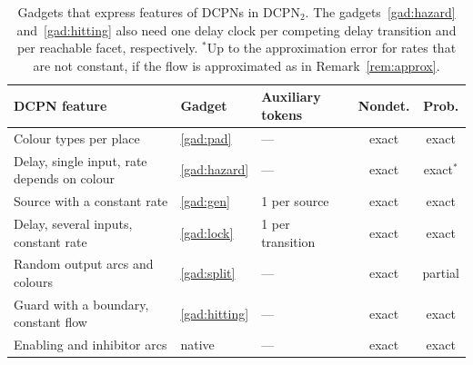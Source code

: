 \documentclass[11pt]{article}
\theoremstyle{definition}
\newcommand{\DCPN}[1]{\texorpdfstring{\textup{DCPN}\ensuremath{_{#1}}}{DCPN#1}}
\begin{document}
\begin{table}[t]
  \centering
  \small
  \begin{tabular}{lllcc}
    \hline
    DCPN feature & Gadget & Auxiliary tokens & Nondet. & Prob. \\
    \hline
    Colour types per place & \ref{gad:pad} & --- & exact & exact \\
    Delay, single input, rate depends on colour
      & \ref{gad:hazard} & --- & exact & exact$^{*}$ \\
    Source with a constant rate & \ref{gad:gen} & 1 per source & exact
      & exact \\
    Delay, several inputs, constant rate & \ref{gad:lock}
      & 1 per transition & exact & exact \\
    Random output arcs and colours & \ref{gad:split} & --- & exact
      & partial \\
    Guard with a boundary, constant flow & \ref{gad:hitting} & --- & exact
      & exact \\
    Enabling and inhibitor arcs & native & --- & exact & exact \\
    \hline
  \end{tabular}
  \caption{Gadgets that express features of DCPNs in \DCPN{2}. The
    gadgets~\ref{gad:hazard} and~\ref{gad:hitting} also need one delay clock
    per competing delay transition and per reachable facet, respectively.
    $^{*}$Up to the approximation error for rates that are not constant,
    if the flow is approximated as in Remark~\ref{rem:approx}.}
  \label{tab:gadgets}
\end{table}
\end{document}
